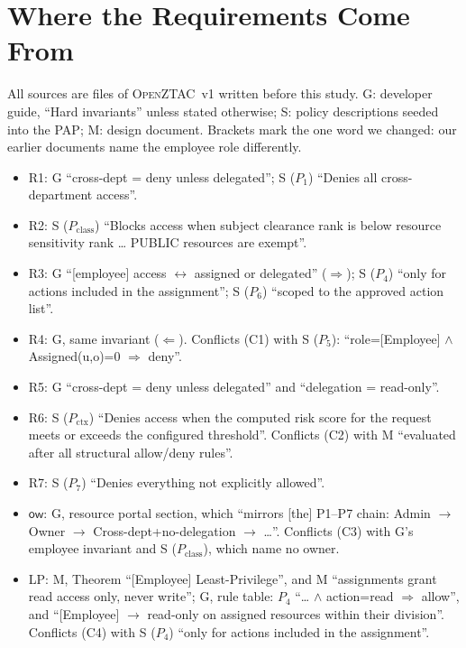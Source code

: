 \documentclass[sigconf,review,anonymous]{acmart}
\newcommand{\sysname}{\textsc{OpenZTAC}\xspace}
\newcommand{\sysname}{\textsc{Atrium}\xspace}
\newcommand{\sysname}{\textsc{OpenZTAC}\xspace}
\newcommand{\Pc}{P_{\mathrm{class}}}
\newcommand{\Px}{P_{\mathrm{ctx}}}
\newcommand{\ow}{\mathsf{ow}}
\begin{document}



\appendix
\section{Where the Requirements Come From}
\label{app:prov}
\sloppy
All sources are files of \sysname~v1 written before this study. G: developer guide, ``Hard invariants'' unless stated
otherwise; S: policy descriptions seeded into the PAP; M: design document. Brackets mark the one word we changed: our
earlier documents name the employee role differently.
\begin{itemize}[leftmargin=*,nosep]
\item R1: G ``cross-dept = deny unless delegated''; S ($P_1$) ``Denies all cross-department access''.
\item R2: S ($\Pc$) ``Blocks access when subject clearance rank is below resource sensitivity rank \ldots{} PUBLIC
resources are exempt''.
\item R3: G ``[employee] access $\leftrightarrow$ assigned or delegated'' ($\Rightarrow$); S ($P_4$) ``only for actions
included in the assignment''; S ($P_6$) ``scoped to the approved action list''.
\item R4: G, same invariant ($\Leftarrow$). Conflicts (C1) with S ($P_5$): ``role=[Employee] $\wedge$ Assigned(u,o)=0
$\Rightarrow$\allowbreak{} deny''.
\item R5: G ``cross-dept = deny unless delegated'' and ``delegation = read-only''.
\item R6: S ($\Px$) ``Denies access when the computed risk score for the request meets or exceeds the configured
threshold''. Conflicts (C2) with M ``evaluated after all structural allow/deny rules''.
\item R7: S ($P_7$) ``Denies everything not explicitly allowed''.
\item $\ow$: G, resource portal section, which ``mirrors [the] P1--P7 chain: Admin $\to$ Owner $\to$
Cross-dept+no-delegation $\to$ \ldots''. Conflicts (C3) with G's employee invariant and S ($\Pc$), which name no owner.
\item LP: M, Theorem ``[Employee] Least-Privilege'', and M ``assignments grant read access only, never write''; G, rule
table: $P_4$ ``\ldots{} $\wedge$ action=read $\Rightarrow$ allow'', and ``[Employee] $\to$ read-only on assigned resources
within their division''. Conflicts (C4) with S ($P_4$) ``only for actions included in the assignment''.
\end{itemize}
\end{document}
